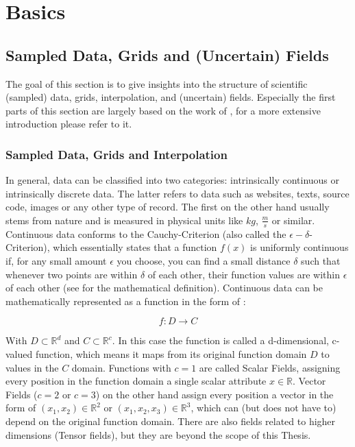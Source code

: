 
\chapter{Basics}
\label{ch:basics}


\section{Sampled Data, Grids and (Uncertain) Fields}
\label{sec:uncertainfields}

The goal of this section is to give insights into the structure of scientific (sampled) data, grids, interpolation, and (uncertain) fields. 
Especially the first parts of this section are largely based on the work of , for a more extensive introduction please refer to it. 

\subsection{Sampled Data, Grids and Interpolation}

In general, data can be classified into two categories: intrinsically continuous or intrinsically discrete data. 
The latter refers to data such as websites, texts, source code, images or any other type of record. 
The first on the other hand usually stems from nature and is measured in physical units like $kg$, $\frac{m}{s}$ or similar.
Continuous data conforms to the Cauchy-Criterion (also called the $\epsilon - \delta$-Criterion), which essentially states that a function $f(x)$ is uniformly continuous if, for any small amount $\epsilon$ you choose, you can find a small distance $\delta$ such that whenever two points are within $\delta$ of each other, their function values are within $\epsilon$ of each other (see \cite{telea2014data} for the mathematical definition). 
Continuous data can be mathematically represented as a function in the form of \cite{telea2014data}:

\begin{equation}
  f: D \rightarrow C
  \label{eq:continous data}
\end{equation}

With $D \subset \mathbb{R}^d$ and $C \subset \mathbb{R}^c$. 
In this case the function is called a d-dimensional, c-valued function, which means it maps from its original function domain $D$ to values in the $C$ domain. 
Functions with $c=1$ are called Scalar Fields, assigning every position in the function domain a single scalar attribute $x \in \mathbb{R}$. 
Vector Fields ($c=2$ or $c=3$) on the other hand assign every position a vector in the form of $(x_1, x_2) \in \mathbb{R}^2$ or $(x_1, x_2, x_3) \in \mathbb{R}^3$, which can (but does not have to) depend on the original function domain. 
There are also fields related to higher dimensions (Tensor fields), but they are beyond the scope of this Thesis. 

